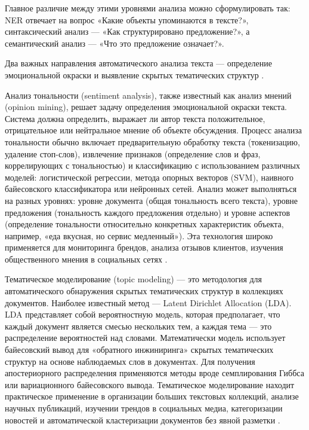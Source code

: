 \documentclass{SibFU-docs}
\begin{document}
Главное различие между этими уровнями анализа можно сформулировать так: NER отвечает на вопрос «Какие объекты упоминаются в тексте?», синтаксический анализ — «Как структурировано предложение?», а семантический анализ — «Что это предложение означает?».


Два важных направления автоматического анализа текста — определение эмоциональной окраски и выявление скрытых тематических структур \cite{Techtarget2024Sentiment, JMLR2003LDA}.

Анализ тональности (sentiment analysis), также известный как анализ мнений (opinion mining), решает задачу определения эмоциональной окраски текста. Система должна определить, выражает ли автор текста положительное, отрицательное или нейтральное мнение об объекте обсуждения. Процесс анализа тональности обычно включает предварительную обработку текста (токенизацию, удаление стоп-слов), извлечение признаков (определение слов и фраз, коррелирующих с тональностью) и классификацию с использованием различных моделей: логистической регрессии, метода опорных векторов (SVM), наивного байесовского классификатора или нейронных сетей. Анализ может выполняться на разных уровнях: уровне документа (общая тональность всего текста), уровне предложения (тональность каждого предложения отдельно) и уровне аспектов (определение тональности относительно конкретных характеристик объекта, например, «еда вкусная, но сервис медленный»). Эта технология широко применяется для мониторинга брендов, анализа отзывов клиентов, изучения общественного мнения в социальных сетях \cite{GeeksforGeeks2024OpinionMining, AyaData2025OpinionMining}.

Тематическое моделирование (topic modeling) — это методология для автоматического обнаружения скрытых тематических структур в коллекциях документов. Наиболее известный метод — Latent Dirichlet Allocation (LDA). LDA представляет собой вероятностную модель, которая предполагает, что каждый документ является смесью нескольких тем, а каждая тема — это распределение вероятностей над словами. Математически модель использует байесовский вывод для «обратного инжиниринга» скрытых тематических структур на основе наблюдаемых слов в документах. Для получения апостериорного распределения применяются методы вроде семплирования Гиббса или вариационного байесовского вывода. Тематическое моделирование находит практическое применение в организации больших текстовых коллекций, анализе научных публикаций, изучении трендов в социальных медиа, категоризации новостей и автоматической кластеризации документов без явной разметки \cite{GeeksforGeeks2021LDA, Wikipedia2006LDA}.
\end{document}
